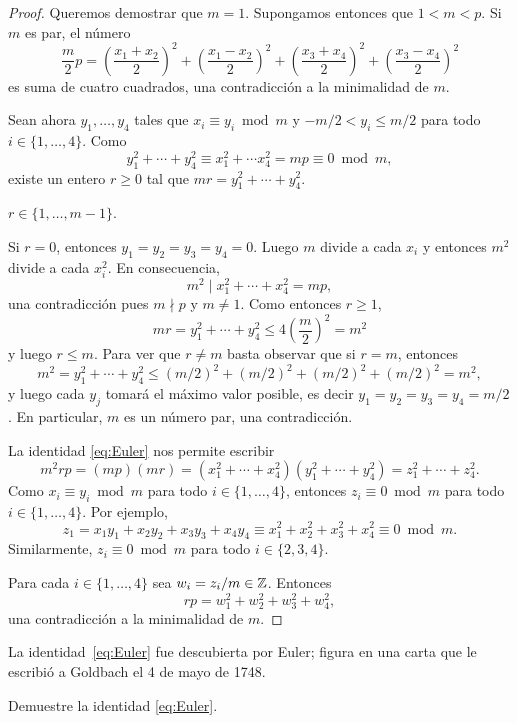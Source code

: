 \begin{proof}
	Queremos demostrar que $m=1$. Supongamos
	entonces que $1<m<p$. Si $m$ es par, el número 
	\[
		\frac{m}{2}p=\left(\frac{x_1+x_2}{2}\right)^2
		+\left(\frac{x_1-x_2}{2}\right)^2
		+\left(\frac{x_3+x_4}{2}\right)^2
		+\left(\frac{x_3-x_4}{2}\right)^2
	\]
	es suma de cuatro cuadrados, una contradicción a la minimalidad de $m$. 
	
	Sean ahora $y_1,\dots,y_4$ tales que $x_i\equiv y_i\bmod m$
	y $-m/2<y_i\leq m/2$ para todo $i\in\{1,\dots,4\}$. Como
	\[
		y_1^2+\cdots+y_4^2\equiv x_1^2+\cdots x_4^2= mp\equiv 0\bmod m,
	\]
	existe un entero $r\geq0$ tal que $mr=y_1^2+\cdots+y_4^2$. 
	
	\begin{claim}
		$r\in\{1,\dots,m-1\}$. 
	\end{claim}

	Si $r=0$, entonces $y_1=y_2=y_3=y_4=0$. Luego $m$ divide a cada $x_i$ y
	entonces $m^2$ divide a cada $x_i^2$. En consecuencia, 
	\[
		m^2\mid x_1^2+\cdots+x_4^2=mp,
	\]
	una contradicción pues $m\nmid p$ y $m\ne1$. Como entonces $r\geq 1$, 
	\[
		mr=y_1^2+\cdots+y_4^2\leq 4\left(\frac{m}{2}\right)^2=m^2
	\]
	y luego $r\leq m$. Para ver que $r\ne m$ basta observar que si $r=m$, 
	entonces 
	\[
		m^2=y_1^2+\cdots+y_4^2\leq (m/2)^2+(m/2)^2+(m/2)^2+(m/2)^2=m^2,
	\]
	y luego cada $y_j$ tomará el máximo valor posible, es decir
	$y_1=y_2=y_3=y_4=m/2$. En particular, $m$ es un número par, una contradicción. 

	\medskip
	La identidad \ref{eq:Euler} nos permite escribir
	\[
		m^2rp=(mp)(mr)=(x_1^2+\cdots+x_4^2)(y_1^2+\cdots+y_4^2)=z_1^2+\cdots+z_4^2.
	\]
	Como $x_i\equiv y_i\bmod m$ para todo $i\in\{1,\dots,4\}$, entonces 
	$z_i\equiv 0\bmod m$ para todo $i\in\{1,\dots,4\}$. Por ejemplo,
	\[
	z_1=x_1y_1+x_2y_2+x_3y_3+x_4y_4\equiv x_1^2+x_2^2+x_3^2+x_4^2\equiv 0\bmod m.
	\]
	Similarmente, $z_i\equiv0\bmod m$ para todo $i\in\{2,3,4\}$. 
	
	Para cada $i\in\{1,\dots,4\}$ sea
	$w_i=z_i/m\in\mathbb{Z}$. Entonces 
	\[
		rp=w_1^2+w_2^2+w_3^2+w_4^2,
	\]
	una contradicción a la minimalidad de $m$.
\end{proof}

La identidad~\eqref{eq:Euler} fue descubierta por Euler; figura en una carta
que le escribió a Goldbach el 4 de mayo de 1748.

\begin{exercise}
    Demuestre la identidad \eqref{eq:Euler}. 
\end{exercise}

